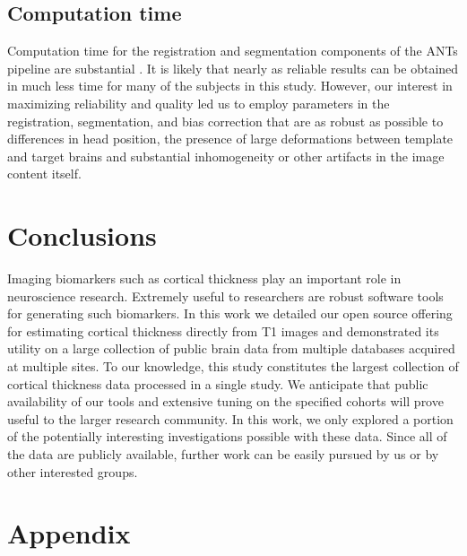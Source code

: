 \subsection{Computation time}
Computation time for the registration and segmentation components of
the ANTs pipeline are substantial {\color{blue}{but are not significantly worse than
those of FreeSurfer}}.  It is likely that nearly as reliable
results can be obtained in much less time for many of the subjects in
this study.  However, our interest in
maximizing reliability and quality led us to employ parameters in the
registration, segmentation, and bias correction that are as robust as
possible to differences in head position, the presence of large
deformations between template and target brains and substantial
inhomogeneity or other artifacts in the image content itself.  

\section{Conclusions}

Imaging biomarkers such as cortical thickness play an 
important role in neuroscience research.  Extremely useful to
researchers are robust software tools for generating such 
biomarkers.  In this work we detailed our open source offering for estimating
cortical thickness directly from T1 images and demonstrated
its utility on a large collection of public brain data from
multiple databases acquired at multiple sites.  To our knowledge,
this study constitutes the largest collection of cortical
thickness data processed in a single study.  
We anticipate that public availability of our tools and extensive tuning on
the specified cohorts will prove useful to the larger
research community.   In this work, we only explored a portion of the potentially
interesting investigations possible with these data.
Since all of the data are publicly available, further work can
be easily pursued by us or by other interested groups.


\section*{Appendix}


